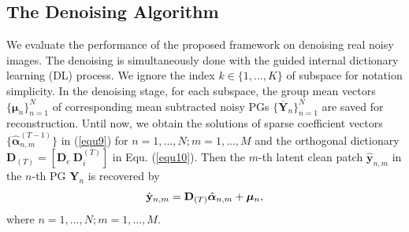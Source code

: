 \documentclass[10pt,twocolumn,letterpaper]{article}
\begin{document}
\subsection{The Denoising Algorithm}

We evaluate the performance of the proposed framework on denoising real noisy images. The denoising is simultaneously done with the guided internal dictionary learning (DL) process. We ignore the index $k\in\{1,...,K\}$ of subspace for notation simplicity. In the denoising stage, for each subspace, the group mean vectors $\{\bm{\mu}_{n}\}_{n=1}^{N}$ of corresponding mean subtracted noisy PGs $\{\mathbf{\overline{Y}}_{n}\}_{n=1}^{N}$ are saved for reconstruction. Until now, we obtain the solutions of sparse coefficient vectors $\{\hat{\bm{\alpha}}_{n,m}^{(T-1)}\}$ in (\ref{equ9}) for $n=1,...,N;m=1,...,M$ and the orthogonal dictionary $\mathbf{D}_{(T)} = [\mathbf{D}_{e}\ \mathbf{D}_{i}^{(T)}]$ in Equ. (\ref{equ10}). Then the $m$-th latent clean patch $\hat{\mathbf{y}}_{n,m}$ in the $n$-th PG $\mathbf{Y}_{n}$ is recovered by 
\vspace{-2mm}
\begin{equation}\label{equ12}\vspace{-2mm}
\hat{\mathbf{y}}_{n,m}=\mathbf{D}_{(T)}\hat{\bm{\alpha}}_{n,m}+\bm{\mu}_{n},
\end{equation}
where $n=1,...,N;m=1,...,M$.
\end{document}
